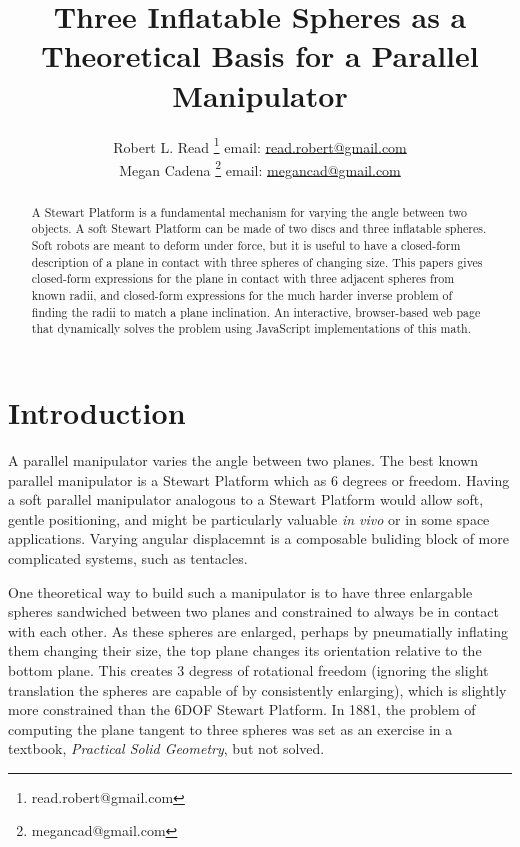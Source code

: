 \documentclass{article}
\title{Three Inflatable Spheres as a Theoretical Basis for a Parallel Manipulator}
\author{Robert L. Read
  \thanks{read.robert@gmail.com}
  email: \href{mailto:read.robert@gmail.com}{read.robert@gmail.com}\\
Megan Cadena
  \thanks{megancad@gmail.com}
  email: \href{mailto:megancad@gmail.com}{megancad@gmail.com}
  }
\begin{document}
\maketitle

\begin{abstract}
  A Stewart Platform\cite{wiki:stewart} is a fundamental mechanism for varying the angle
  between two objects.
  A soft Stewart Platform can be made of two discs and
  three inflatable spheres.
  Soft robots are meant to deform under force, but it is useful to have
  a closed-form description of a plane in contact with three spheres of changing size.
  This papers gives closed-form expressions for the plane in contact with
  three adjacent spheres from known radii, and closed-form expressions for
  the much harder inverse problem of finding the radii to match a plane inclination.
  An interactive,
  browser-based web page that dynamically solves the problem\cite{softrobotcalc}
  using JavaScript implementations of this math.
\end{abstract}


\section{Introduction}

A parallel manipulator varies the angle between two planes.
The best known parallel manipulator is
a Stewart Platform\cite{wiki:stewart} which as 6 degrees or freedom.
Having a soft parallel manipulator analogous to a Stewart Platform would allow soft,
gentle positioning,
and might be particularly valuable {\it in vivo}\cite{white2018soft} or in some space applications\cite{glassner2020soft}.
Varying angular displacemnt is a composable buliding block of more complicated systems, such as tentacles.

One theoretical way to build such a manipulator is to have three enlargable spheres sandwiched between two planes
and constrained to always be in contact with each other.
As these spheres are enlarged, perhaps by pneumatially inflating them changing
their size, the top plane changes its orientation relative to the bottom plane.
This creates 3 degress of rotational freedom
(ignoring the slight translation the spheres are capable of by consistently enlarging),
which is slightly more constrained than the 6DOF Stewart Platform.
In 1881, the problem of computing the plane tangent to three spheres was
set as an exercise in a textbook, {\em Practical Solid Geometry}\cite{payne1881},
but not solved.
\end{document}
